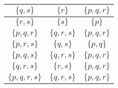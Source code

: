 \documentclass{report}
\begin{document}
{\begin{center}
\begin{tabular}{|c|c|c|}
    $\{ q,s \}$           & $\{ r \}$              & $\{ p, q, r \}$        \\ \hline
    $\{ r,s \}$           & $\{ s \}$              & $\{ p \}$              \\ \hline
    $\{ p,q,r \}$         & $\{ q, r, s \}$        & $\{ p, q, r \}$        \\ \hline
    $\{ p,r,s \}$         & $\{ q, s \}$           & $\{ p,q \}$           \\ \hline
    $\{ p,q,s \}$         & $\{ q, r, s \}$        & $\{ p, q, r \}$        \\ \hline
    $\{ q,r,s \}$         & $\{ r, s \}$           & $\{ p, q, r \}$        \\ \hline
    $\{ p,q,r,s \}$       & $\{ q, r, s \}$        & $\{ p, q, r \}$        \\ \hline
  \end{tabular}
\end{center}
}
\end{document}

